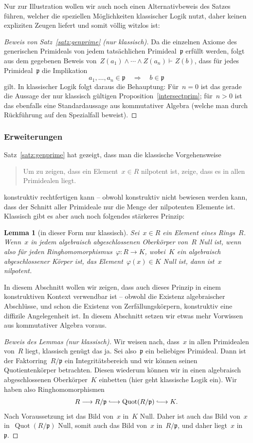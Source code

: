 \documentclass[a4paper,ngerman,12pt]{scrartcl}
\theoremstyle{definition}
\theoremstyle{plain}
\newtheorem{lemma}[defn]{Lemma}
\theoremstyle{remark}
\newcommand{\lhra}{\ensuremath{\lhook\joinrel\relbar\joinrel\rightarrow}}
\newcommand{\pp}{\mathfrak{p}}
\DeclareMathOperator{\Quot}{Quot}
\newcommand{\seq}[1]{\mathrel{\vdash\!\!\!_{#1}}}
\renewcommand{\_}{\mathpunct{.}\,}
\newcommand{\?}{\,{:}\,}
\begin{document}
Nur zur Illustration wollen wir auch noch einen Alternativbeweis des Satzes
führen, welcher die speziellen Möglichkeiten klassischer Logik nutzt, daher
keinen expliziten Zeugen liefert und somit völlig witzlos ist:
\begin{proof}[Beweis von Satz~\ref{satz:genprime} (nur klassisch)]
Da die einzelnen Axiome des generischen Primideals von jedem tatsächlichen
Primideal~$\pp$ erfüllt werden, folgt aus dem gegebenen Beweis von~$Z(a_1) \wedge
\cdots \wedge Z(a_n) \seq{} Z(b)$, dass für jedes Primideal~$\pp$ die
Implikation
\[ a_1,\ldots,a_n \in \pp \quad\Longrightarrow\quad b \in \pp \]
gilt. In klassischer Logik folgt daraus die Behauptung: Für~$n = 0$ ist das
gerade die Aussage der nur klassisch gültigen Proposition~\ref{intersectprim};
für~$n > 0$ ist das ebenfalls eine Standardaussage aus kommutativer Algebra
(welche man durch Rückführung auf den Spezialfall beweist).
\end{proof}


\subsubsection*{Erweiterungen}

Satz~\ref{satz:genprime} hat gezeigt, dass man die klassische Vorgehensweise
\begin{quote}
Um zu zeigen, dass ein Element~$x \in R$ nilpotent ist, zeige, dass es in allen
Primidealen liegt.\end{quote}
konstruktiv rechtfertigen kann -- obwohl konstruktiv nicht bewiesen werden
kann, dass der Schnitt aller Primideale nur die Menge der nilpotenten Elemente
ist. Klassisch gibt es aber auch noch folgendes stärkeres Prinzip:
\begin{lemma}[in dieser Form nur klassisch]\label{lemma:nullinabschl}%
Sei~$x \in R$ ein Element eines Rings~$R$. Wenn~$x$ in jedem algebraisch
abgeschlossenen Oberkörper von~$R$ Null ist, wenn also für jeden
Ringhomomorphismus~$\varphi : R \to K$, wobei~$K$ ein algebraisch
abgeschlossener Körper ist, das Element~$\varphi(x) \in K$ Null ist, dann
ist~$x$ nilpotent.\end{lemma}
In diesem Abschnitt wollen wir zeigen, dass auch dieses Prinzip
in einem konstruktiven Kontext verwendbar ist -- obwohl die Existenz
algebraischer Abschlüsse, und schon die Existenz von Zerfällungskörpern,
konstruktiv eine diffizile Angelegenheit ist. In diesem Abschnitt setzen wir
etwas mehr Vorwissen aus kommutativer Algebra voraus.

\begin{proof}[Beweis des Lemmas (nur klassisch)]
Wir weisen nach, dass~$x$ in allen Primidealen von~$R$ liegt, klassisch genügt
das ja. Sei also~$\pp$ ein beliebiges Primideal. Dann ist der
Faktorring~$R/\pp$ ein Integritätsbereich und wir können seinen
Quotientenkörper betrachten. Diesen wiederum können wir in einen algebraisch
abgeschlossenen Oberkörper~$K$ einbetten (hier geht klassische Logik ein). Wir
haben also Ringhomomorphismen
\[ R \longrightarrow R/\pp \lhra \Quot(R/\pp) \lhra K. \]
Nach Voraussetzung ist das Bild von~$x$ in~$K$ Null. Daher ist auch das Bild
von~$x$ in~$\Quot(R/\pp)$ Null, somit auch das Bild von~$x$ in~$R/\pp$, und
daher liegt~$x$ in~$\pp$.
\end{proof}
\end{document}
